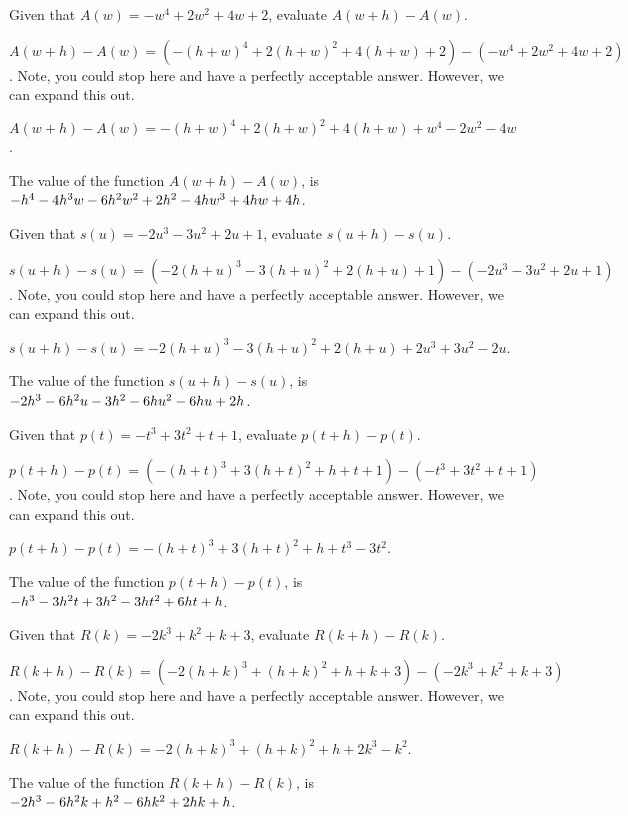 \begin{shuffle}
\begin{exercise}
Given that $A(w)=-w^4+2 w^2+4 w+2$, evaluate $A(w+h)-A(w)$.
\begin{solution}
\begin{hint}
$A(w+h)-A(w)=(-(h+w)^4+2 (h+w)^2+4 (h+w)+2)-(-w^4+2 w^2+4 w+2)$. Note, you could stop here and have a perfectly acceptable answer. However, we can expand this out.
\end{hint}
\begin{hint}
$A(w+h)-A(w)=-(h+w)^4+2 (h+w)^2+4 (h+w)+w^4-2 w^2-4 w$.
\end{hint}
The value of the function $A(w+h)-A(w)$, is ${-h^4-4 h^3 w-6 h^2 w^2+2 h^2-4 h w^3+4 h w+4 h}$.
\end{solution}
\end{exercise}

\begin{exercise}
Given that $s(u)=-2 u^3-3 u^2+2 u+1$, evaluate $s(u+h)-s(u)$.
\begin{solution}
\begin{hint}
$s(u+h)-s(u)=(-2 (h+u)^3-3 (h+u)^2+2 (h+u)+1)-(-2 u^3-3 u^2+2 u+1)$. Note, you could stop here and have a perfectly acceptable answer. However, we can expand this out.
\end{hint}
\begin{hint}
$s(u+h)-s(u)=-2 (h+u)^3-3 (h+u)^2+2 (h+u)+2 u^3+3 u^2-2 u$.
\end{hint}
The value of the function $s(u+h)-s(u)$, is ${-2 h^3-6 h^2 u-3 h^2-6 h u^2-6 h u+2 h}$.
\end{solution}
\end{exercise}

\begin{exercise}
Given that $p(t)=-t^3+3 t^2+t+1$, evaluate $p(t+h)-p(t)$.
\begin{solution}
\begin{hint}
$p(t+h)-p(t)=(-(h+t)^3+3 (h+t)^2+h+t+1)-(-t^3+3 t^2+t+1)$. Note, you could stop here and have a perfectly acceptable answer. However, we can expand this out.
\end{hint}
\begin{hint}
$p(t+h)-p(t)=-(h+t)^3+3 (h+t)^2+h+t^3-3 t^2$.
\end{hint}
The value of the function $p(t+h)-p(t)$, is ${-h^3-3 h^2 t+3 h^2-3 h t^2+6 h t+h}$.
\end{solution}
\end{exercise}

\begin{exercise}
Given that $R(k)=-2 k^3+k^2+k+3$, evaluate $R(k+h)-R(k)$.
\begin{solution}
\begin{hint}
$R(k+h)-R(k)=(-2 (h+k)^3+(h+k)^2+h+k+3)-(-2 k^3+k^2+k+3)$. Note, you could stop here and have a perfectly acceptable answer. However, we can expand this out.
\end{hint}
\begin{hint}
$R(k+h)-R(k)=-2 (h+k)^3+(h+k)^2+h+2 k^3-k^2$.
\end{hint}
The value of the function $R(k+h)-R(k)$, is ${-2 h^3-6 h^2 k+h^2-6 h k^2+2 h k+h}$.
\end{solution}
\end{exercise}


\end{shuffle}
